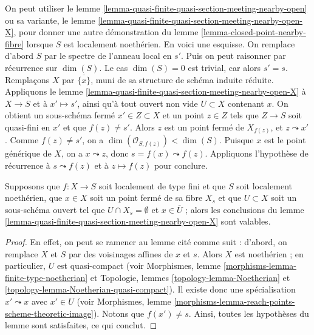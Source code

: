 \begin{remark}
\label{remark-alternative-closed-point-nearby-fibre}
On peut utiliser le
lemme \ref{lemma-quasi-finite-quasi-section-meeting-nearby-open}
ou sa variante, le
lemme \ref{lemma-quasi-finite-quasi-section-meeting-nearby-open-X},
pour donner une autre démonstration du
lemme \ref{lemma-closed-point-nearby-fibre}
lorsque $S$ est localement noethérien.
En voici une esquisse.
On remplace d'abord $S$ par
le spectre de l'anneau local en $s'$. Puis on peut raisonner par récurrence
sur $\dim(S)$. Le cas $\dim(S) = 0$ est trivial, car alors $s' = s$.
Remplaçons $X$ par $\overline{\{x\}}$, muni de sa structure de schéma induite réduite.
Appliquons le
lemme \ref{lemma-quasi-finite-quasi-section-meeting-nearby-open-X}
à $X \to S$ et à $x' \mapsto s'$, ainsi qu'à tout
ouvert non vide $U \subset X$ contenant $x$. On obtient un sous-schéma fermé
$x' \in Z \subset X$ et un point $z \in Z$
tels que $Z \to S$ soit quasi-fini en $x'$ et que $f(z) \not = s'$.
Alors $z$ est un point fermé de $X_{f(z)}$, et $z \leadsto x'$.
Comme $f(z) \not = s'$, on a $\dim(\mathcal{O}_{S, f(z)}) < \dim(S)$.
Puisque $x$ est le point générique de $X$, on a $x \leadsto z$, donc
$s = f(x) \leadsto f(z)$.
Appliquons l'hypothèse de récurrence à $s \leadsto f(z)$ et à $z \mapsto f(z)$
pour conclure.
\end{remark}

\begin{lemma}
\label{lemma-change-hypotheses}
Supposons que $f : X \to S$ soit localement de type fini et que $S$ soit localement noethérien,
que $x \in X$ soit un point fermé de sa fibre $X_s$ et que $U \subset X$ soit un sous-schéma
ouvert tel que $U \cap X_s = \emptyset$ et $x \in \overline{U}$ ; alors
les conclusions du
lemme \ref{lemma-quasi-finite-quasi-section-meeting-nearby-open-X}
sont valables.
\end{lemma}

\begin{proof}
En effet, on peut se ramener au lemme cité comme suit : d'abord, on
remplace $X$ et $S$ par des voisinages affines de $x$ et $s$. Alors $X$ est
noethérien ; en particulier, $U$ est quasi-compact (voir
Morphismes, lemme \ref{morphisms-lemma-finite-type-noetherian}
et
Topologie, lemmes \ref{topology-lemma-Noetherian} et
\ref{topology-lemma-Noetherian-quasi-compact}).
Il existe donc une spécialisation $x' \leadsto x$ avec $x' \in U$ (voir
Morphismes, lemme \ref{morphisms-lemma-reach-points-scheme-theoretic-image}).
Notons que $f(x') \not = s$. Ainsi, toutes les hypothèses du lemme
sont satisfaites, ce qui conclut.
\end{proof}



